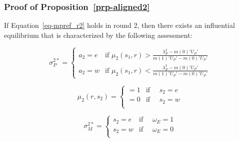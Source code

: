 \documentclass[
  12pt,
]{article}
\theoremstyle{plain}
\theoremstyle{plain}
\theoremstyle{remark}
\begin{document}
\subsubsection{\texorpdfstring{Proof of
Proposition~\ref{prp-aligned2}}{Proof of Proposition~}}\label{proof-of-prp-aligned2}

If Equation~\ref{eq-mpref_r2} holds in round 2, then there exists an
influential equilibrium that is characterized by the following
assessment:

\[
\sigma_P^{2*} = 
\begin{cases} 
a_2 = e & \text{if } \mu_2(s_1, r) > \frac{\lambda^2_P - m(0)' U_P '}{m(1)' U_P' - m(0)' U_P'}\\
a_2 = w & \text{if } \mu_2(s_1, r) < \frac{\lambda^2_P - m(0)' U_P '}{m(1)' U_P' - m(0)' U_P'}
\end{cases}
\]

\[
\mu_2(r, s_2) =
\begin{cases} 
 = 1 & \text{if } \quad s_2 = e \\
= 0 & \text{if } \quad s_2 = w  \\
\end{cases}
\]

\[
\sigma_M^{2*} = 
\begin{cases} 
s_2 =  e & \text{if } \quad \omega_E = 1 \\
s_2 =  w & \text{if } \quad \omega_E = 0 \\
\end{cases}
\]
\end{document}
